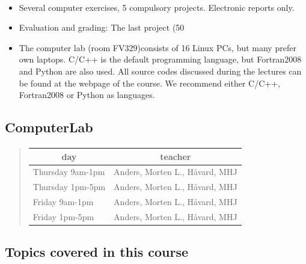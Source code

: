 \documentclass[%
oneside,                 %
final,                   %
10pt]{article}
\begin{document}
\paragraph{}
\begin{itemize}
  \item Several computer exercises, 5 compulsory projects. Electronic reports only.

  \item Evaluation and grading: The last project (50%

  \item The computer lab (room FV329)consists of 16 Linux PCs, but many prefer own laptops. C/C++ is the default programming language, but Fortran2008 and Python are also used. All source codes discussed during the lectures can be found at the webpage of the course. We recommend either C/C++, Fortran2008 or Python as languages.
\end{itemize}

\noindent



\subsection{ComputerLab}


\paragraph{}


\begin{quote}
\begin{tabular}{ll}
\hline
\multicolumn{1}{c}{ day } & \multicolumn{1}{c}{ teacher } \\
\hline
Thursday 9am-1pm & Anders, Morten L., Håvard, MHJ \\
Thursday 1pm-5pm & Anders, Morten L., Håvard, MHJ \\
Friday 9am-1pm   & Anders, Morten L., Håvard, MHJ \\
Friday 1pm-5pm   & Anders, Morten L., Håvard, MHJ \\
\hline
\end{tabular}
\end{quote}

\noindent



\subsection{Topics covered in this course}
\end{document}
